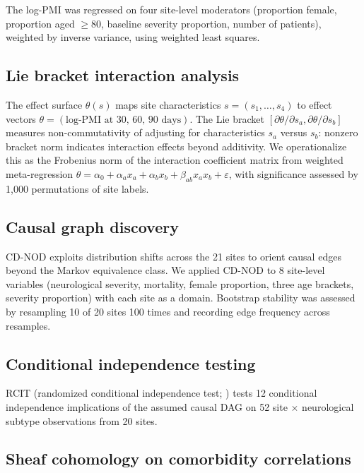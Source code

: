 \documentclass{article}
\begin{document}
The log-PMI was regressed on four site-level moderators (proportion female, proportion aged $\geq 80$, baseline severity proportion, number of patients), weighted by inverse variance, using weighted least squares.

\subsection{Lie bracket interaction analysis}

The effect surface $\theta(s)$ maps site characteristics $s = (s_1, \ldots, s_4)$ to effect vectors $\theta = (\text{log-PMI at 30, 60, 90 days})$.
The Lie bracket $[\partial\theta/\partial s_a, \partial\theta/\partial s_b]$ measures non-commutativity of adjusting for characteristics $s_a$ versus $s_b$: nonzero bracket norm indicates interaction effects beyond additivity.
We operationalize this as the Frobenius norm of the interaction coefficient matrix from weighted meta-regression $\theta = \alpha_0 + \alpha_a x_a + \alpha_b x_b + \beta_{ab} x_a x_b + \varepsilon$, with significance assessed by 1,000 permutations of site labels.

\subsection{Causal graph discovery}

CD-NOD \cite{huang2020cdnod} exploits distribution shifts across the 21 sites to orient causal edges beyond the Markov equivalence class.
We applied CD-NOD to 8 site-level variables (neurological severity, mortality, female proportion, three age brackets, severity proportion) with each site as a domain.
Bootstrap stability was assessed by resampling 10 of 20 sites 100 times and recording edge frequency across resamples.

\subsection{Conditional independence testing}

RCIT (randomized conditional independence test; \citealt{strobl2019rcit}) tests 12 conditional independence implications of the assumed causal DAG on 52 site $\times$ neurological subtype observations from 20 sites.

\subsection{Sheaf cohomology on comorbidity correlations}
\end{document}
